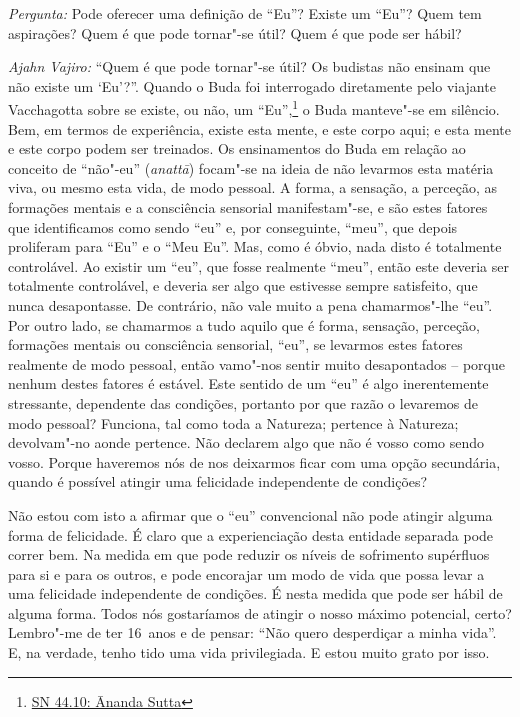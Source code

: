 \bigskip

\emph{Pergunta:} Pode oferecer uma definição de ``Eu''? Existe um ``Eu''? Quem tem
aspirações? Quem é que pode tornar"-se útil? Quem é que pode ser hábil?

\emph{Ajahn Vajiro:} ``Quem é que pode tornar"-se útil? Os budistas não ensinam
que não existe um `Eu'?''. Quando o Buda foi interrogado diretamente pelo
viajante Vacchagotta sobre se existe, ou não, um
``Eu'',\footnote{\href{https://suttacentral.net/sn44.10/en/bodhi}{SN 44.10: Ānanda
    Sutta}} o Buda manteve"-se em silêncio. Bem, em termos de experiência, existe
esta mente, e este corpo aqui; e esta mente e este corpo podem ser treinados. Os
ensinamentos do Buda em relação ao conceito de ``não"-eu'' (\emph{anattā}) focam"-se na
ideia de não levarmos esta matéria viva, ou mesmo esta vida, de modo pessoal. A
forma, a sensação, a perceção, as formações mentais e a consciência sensorial 
manifestam"-se, e são
estes fatores que identificamos como sendo ``eu'' e, por conseguinte, ``meu'',
que depois proliferam para ``Eu'' e o ``Meu Eu''. Mas, como é óbvio, nada disto
é totalmente controlável. Ao existir um ``eu'', que fosse realmente ``meu'',
então este deveria ser totalmente controlável, e deveria ser algo que estivesse
sempre satisfeito, que nunca desapontasse. De contrário, não vale muito a pena
chamarmos"-lhe ``eu''. Por outro lado, se chamarmos a tudo aquilo que é forma,
sensação, perceção, formações mentais ou consciência sensorial, ``eu'', se levarmos estes fatores
realmente de modo pessoal, então vamo"-nos sentir muito desapontados -- porque
nenhum destes fatores é estável. Este sentido de um ``eu'' é algo inerentemente
stressante, dependente das condições, portanto por que razão o levaremos de modo
pessoal? Funciona, tal como toda a Natureza; pertence à Natureza; devolvam"-no
aonde pertence. Não declarem algo que não é vosso como sendo vosso. Porque
haveremos nós de nos deixarmos ficar com uma opção secundária, quando é possível
atingir uma felicidade independente de condições?

Não estou com isto a afirmar que o ``eu'' convencional não pode atingir alguma
forma de felicidade. É claro que a experienciação desta entidade separada pode
correr bem. Na medida em que pode reduzir os níveis de sofrimento supérfluos
para si e para os outros, e pode encorajar um modo de vida que possa levar a uma
felicidade independente de condições. É nesta medida que pode ser hábil de
alguma forma. Todos nós gostaríamos de atingir o nosso máximo potencial, certo?
Lembro"-me de ter 16~anos e de pensar: ``Não quero desperdiçar a minha vida''. E,
na verdade, tenho tido uma vida privilegiada. E estou muito grato por isso.


